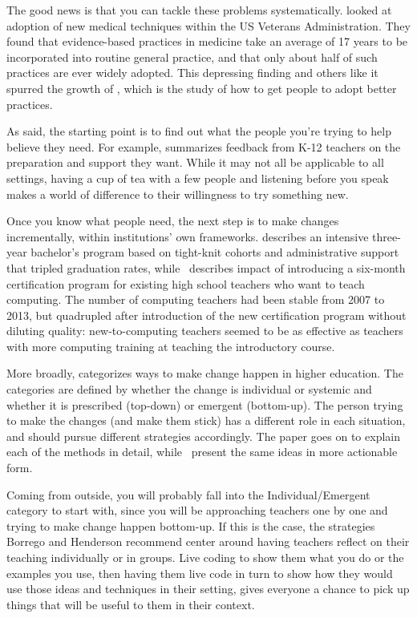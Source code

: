 The good news is that you can tackle these problems systematically.
\cite{Baue2015} looked at adoption of new medical techniques within the US Veterans Administration.
They found that evidence-based practices in medicine
take an average of 17 years to be incorporated into routine general practice,
and that only about half of such practices are ever widely adopted.
This depressing finding and others like it spurred the growth of
,
which is the study of how to get people to adopt better practices.

As  said,
the starting point is to find out what the people you're trying to help believe they need.
For example,
\cite{Yada2016} summarizes feedback from K-12 teachers on the preparation and support they want.
While it may not all be applicable to all settings,
having a cup of tea with a few people and listening before you speak
makes a world of difference to their willingness to try something new.

Once you know what people need,
the next step is to make changes incrementally,
within institutions' own frameworks.
\cite{Nara2018} describes an intensive three-year bachelor's program
based on tight-knit cohorts and administrative support
that tripled graduation rates,
while~\cite{Hu2017} describes impact of introducing a six-month certification program
for existing high school teachers who want to teach computing.
The number of computing teachers had been stable from 2007 to 2013,
but quadrupled after introduction of the new certification program
without diluting quality:
new-to-computing teachers seemed to be as effective as teachers with more computing training
at teaching the introductory course.

More broadly,
\cite{Borr2014} categorizes ways to make change happen in higher education.
The categories are defined by whether the change is individual or systemic
and whether it is prescribed (top-down) or emergent (bottom-up).
The person trying to make the changes (and make them stick)
has a different role in each situation,
and should pursue different strategies accordingly.
The paper goes on to explain each of the methods in detail,
while~\cite{Hend2015a,Hend2015b} present the same ideas in more actionable form.

Coming from outside,
you will probably fall into the Individual/Emergent category to start with,
since you will be approaching teachers one by one
and trying to make change happen bottom-up.
If this is the case,
the strategies Borrego and Henderson recommend center around
having teachers reflect on their teaching individually or in groups.
Live coding to show them what you do or the examples you use,
then having them live code in turn
to show how they would use those ideas and techniques in their setting,
gives everyone a chance to pick up things that will be useful to them in their context.

